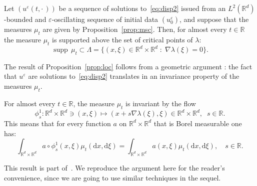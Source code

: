 \documentclass[AHL,Unicode,longabstracts]{cedram}
\DeclareMathOperator{\supp}{supp}
\newcommand*\R{{\mathbb R}}
\newcommand*\eps{\varepsilon}
\numberwithin{equation}{section}
\newcommand*{\dd}{\mathrm{d}}
\newcommand*{\dx}{\dd x}
\newcommand*{\dxi}{\dd \xi}
\begin{document}
\begin{prop}\label{prop:loc}
Let $(u^{\eps}(t,\cdot\,))$ be a sequence of solutions to~\eqref{eq:disp2} issued from an $L^2(\R^d)$-bounded and $\eps$-oscillating sequence of initial data $(u^\eps_0)$, and suppose that the measures $\mu_t$ are given by Proposition~\ref{prop:msc}. Then, for almost every $t\in\R$ the measure $\mu_t$ is supported above the set of critical points of $ \lambda$:
\[
{\supp}\, \mu_t\subset\Lambda=\{ (x,\xi) \in \R^d\times\R^d \; : \; \nabla \lambda(\xi)=0\}.
\]
\end{prop}




The result of Proposition~\ref{prop:loc} follows from a geometric argument : the fact that $u^\eps$ are solutions to~\eqref{eq:disp2} translates in an invariance property of the measures $\mu_t$.

\begin{lemm}\label{lemma:inv1}
For almost every $t\in\R$, the measure $\mu_t$ is invariant by the flow
\[
\phi^1_s : \R^d\times\R^d\ni(x,\xi)\longmapsto (x+s\nabla \lambda(\xi),\xi)\in\R^d\times\R^d,\;\;s\in\R.
\]
This means that for every function $a$ on $\R^d\times\R^d$ that is Borel measurable one has:
\[
\int_{\R^d\times\R^d}a\circ\phi^1_s(x,\xi)\mu_t(\dx,\dxi)=\int_{\R^d\times\R^d}a(x,\xi)\mu_t(\dx,\dxi), \quad s\in\R.
\]
\end{lemm}

This result is part of~\cite[Theorem~2]{MaciaAv}. We reproduce the argument here for the reader's convenience, since we are going to use similar techniques in the sequel.
\end{document}
